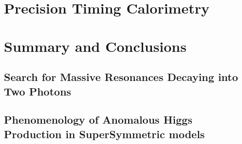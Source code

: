 \documentclass[14pt]{caltech_thesis}
\begin{document}
\part{ Precision Timing Calorimetry}

\part{Summary and Conclusions}




\printbibliography[heading=bibintoc]

 
\appendix

\chapter{Search for Massive Resonances Decaying into Two Photons}

\chapter{Phenomenology of Anomalous Higgs Production in SuperSymmetric models}\label{hggPheno}






\printindex

\theendnotes

\end{document}

